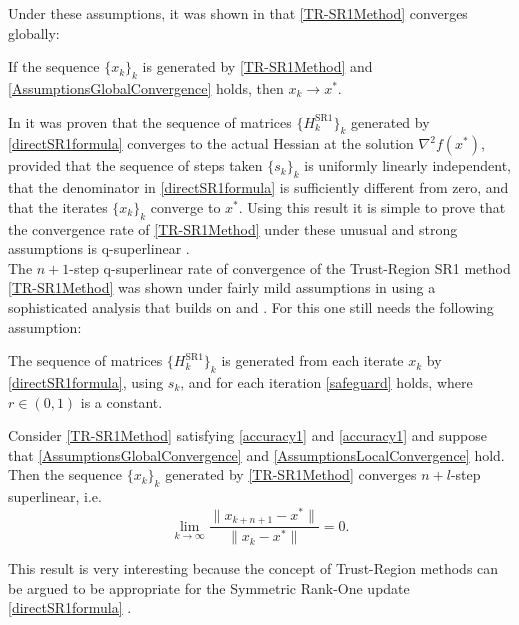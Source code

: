 Under these assumptions, it was shown in \cite{ByrdKhalfanSchnabel:1996} that \cref{TR-SR1Method} converges globally: 

\begin{theorem} \label{GlobalConvergence}
    If the sequence $\{ x_k \}_k$ is generated by \cref{TR-SR1Method} and \cref{AssumptionsGlobalConvergence} holds, then $x_k \rightarrow x^*$.
\end{theorem}

In \cite{ConnGouldToint:1991} it was proven that the sequence of matrices $\{ H^{\mathrm{SR1}}_k \}_k$ generated by \cref{directSR1formula} converges to the actual Hessian at the solution $\nabla^2 f(x^*)$, provided that the sequence of steps taken $\{ s_k \}_k$ is uniformly linearly independent, that the denominator in \cref{directSR1formula} is sufficiently different from zero, and that the iterates $\{ x_k \}_k$ converge to $x^*$. Using this result it is simple to prove that the convergence rate of \cref{TR-SR1Method} under these unusual and strong assumptions is q-superlinear \cite[p.~1026]{ByrdKhalfanSchnabel:1996}. \\
The $n+1$-step q-superlinear rate of convergence of the Trust-Region SR1 method \cref{TR-SR1Method} was shown under fairly mild assumptions in \cite{ByrdKhalfanSchnabel:1996} using a sophisticated analysis that builds on \cite{ConnGouldToint:1991} and \cite{KhalfanByrdSchnabel:1993}. For this one still needs the following assumption:

\begin{assumption}\label{AssumptionsLocalConvergence}
    The sequence of matrices $\{ H^{\mathrm{SR1}}_k \}_k$ is generated from each iterate $x_k$ by \cref{directSR1formula}, using $s_k$, and for each iteration \cref{safeguard} holds, where $r \in (0, 1)$ is a constant.
\end{assumption}

\begin{theorem} \label{LocalConvergence}
    Consider \cref{TR-SR1Method} satisfying \cref{accuracy1} and \cref{accuracy1} and suppose that \cref{AssumptionsGlobalConvergence} and \cref{AssumptionsLocalConvergence} hold. Then the sequence $\{ x_k \}_k$ generated by \cref{TR-SR1Method} converges $n+l$-step superlinear, i.e. 
    \begin{equation}\label{n+1superlinear}
        \lim_{k \rightarrow \infty} \frac{\lVert x_{k+n+1} - x^* \rVert}{\lVert x_k - x^* \rVert} = 0.
    \end{equation}
\end{theorem}

This result is very interesting  because the concept of Trust-Region methods can be argued to be appropriate for the Symmetric Rank-One update \cref{directSR1formula} \cite[p.~1025]{ByrdKhalfanSchnabel:1996}.
